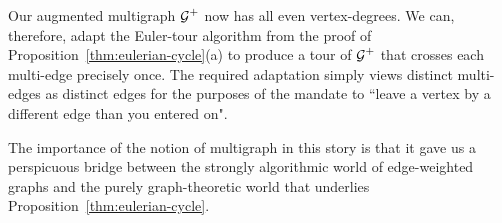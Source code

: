 \smallskip

Our augmented multigraph $\mbox{$\cal G$}^+$ now has all even vertex-degrees.  We can, therefore, adapt the Euler-tour algorithm from the proof of Proposition~\ref{thm:eulerian-cycle}(a) to produce a tour of $\mbox{$\cal G$}^+$ that crosses each multi-edge precisely once.  The required adaptation simply views distinct multi-edges as distinct edges for the purposes of the mandate to ``leave a vertex by a different edge than you entered on".

\medskip

The importance of the notion of multigraph in this story is that it gave us a perspicuous bridge between the strongly algorithmic world of edge-weighted graphs and the purely graph-theoretic world that underlies Proposition~\ref{thm:eulerian-cycle}.
